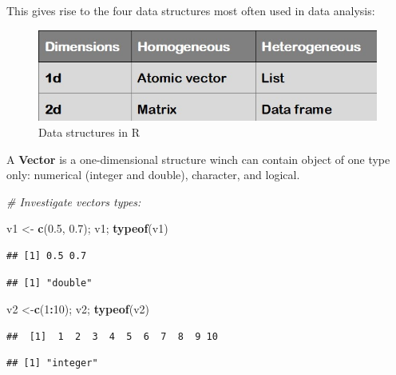 \documentclass[
]{book}
\newenvironment{Shaded}{\begin{snugshade}}{\end{snugshade}}
\newcommand{\CommentTok}[1]{\textcolor[rgb]{0.56,0.35,0.01}{\textit{#1}}}
\newcommand{\DecValTok}[1]{\textcolor[rgb]{0.00,0.00,0.81}{#1}}
\newcommand{\FloatTok}[1]{\textcolor[rgb]{0.00,0.00,0.81}{#1}}
\newcommand{\FunctionTok}[1]{\textcolor[rgb]{0.13,0.29,0.53}{\textbf{#1}}}
\newcommand{\NormalTok}[1]{#1}
\newcommand{\OtherTok}[1]{\textcolor[rgb]{0.56,0.35,0.01}{#1}}
\newcommand{\SpecialCharTok}[1]{\textcolor[rgb]{0.81,0.36,0.00}{\textbf{#1}}}
\begin{document}
This gives rise to the four data structures most often used in data analysis:

\begin{figure}

{\centering \includegraphics[width=0.5\linewidth,height=0.6\textheight]{images/data_type} 

}

\caption{Data structures in R \label{data_str}}\label{fig:img2}
\end{figure}

A \textbf{Vector} is a one-dimensional structure winch can contain object of one type only: numerical (integer and double), character, and logical.

\begin{Shaded}
\begin{Highlighting}[]
\CommentTok{\# Investigate vector\textquotesingle{}s types:}

\NormalTok{v1 }\OtherTok{\textless{}{-}} \FunctionTok{c}\NormalTok{(}\FloatTok{0.5}\NormalTok{, }\FloatTok{0.7}\NormalTok{); v1; }\FunctionTok{typeof}\NormalTok{(v1)}
\end{Highlighting}
\end{Shaded}

\begin{verbatim}
## [1] 0.5 0.7
\end{verbatim}

\begin{verbatim}
## [1] "double"
\end{verbatim}

\begin{Shaded}
\begin{Highlighting}[]
\NormalTok{v2 }\OtherTok{\textless{}{-}}\FunctionTok{c}\NormalTok{(}\DecValTok{1}\SpecialCharTok{:}\DecValTok{10}\NormalTok{); v2; }\FunctionTok{typeof}\NormalTok{(v2)}
\end{Highlighting}
\end{Shaded}

\begin{verbatim}
##  [1]  1  2  3  4  5  6  7  8  9 10
\end{verbatim}

\begin{verbatim}
## [1] "integer"
\end{verbatim}
\end{document}

